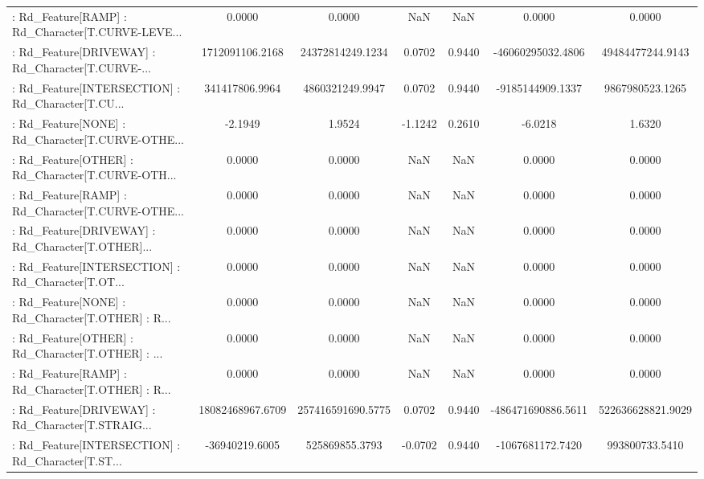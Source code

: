 \begin{longtable}{p{4cm}cccccc}
 : Rd\_Feature[RAMP] : Rd\_Character[T.CURVE-LEVE... &            0.0000 &            0.0000 &     NaN &          NaN &             0.0000 &            0.0000 \\
 : Rd\_Feature[DRIVEWAY] : Rd\_Character[T.CURVE-... &   1712091106.2168 &  24372814249.1234 &  0.0702 &       0.9440 &  -46060295032.4806 &  49484477244.9143 \\
 : Rd\_Feature[INTERSECTION] : Rd\_Character[T.CU... &    341417806.9964 &   4860321249.9947 &  0.0702 &       0.9440 &   -9185144909.1337 &   9867980523.1265 \\
 : Rd\_Feature[NONE] : Rd\_Character[T.CURVE-OTHE... &           -2.1949 &            1.9524 & -1.1242 &       0.2610 &            -6.0218 &            1.6320 \\
 : Rd\_Feature[OTHER] : Rd\_Character[T.CURVE-OTH... &            0.0000 &            0.0000 &     NaN &          NaN &             0.0000 &            0.0000 \\
 : Rd\_Feature[RAMP] : Rd\_Character[T.CURVE-OTHE... &            0.0000 &            0.0000 &     NaN &          NaN &             0.0000 &            0.0000 \\
 : Rd\_Feature[DRIVEWAY] : Rd\_Character[T.OTHER]... &            0.0000 &            0.0000 &     NaN &          NaN &             0.0000 &            0.0000 \\
 : Rd\_Feature[INTERSECTION] : Rd\_Character[T.OT... &            0.0000 &            0.0000 &     NaN &          NaN &             0.0000 &            0.0000 \\
 : Rd\_Feature[NONE] : Rd\_Character[T.OTHER] : R... &            0.0000 &            0.0000 &     NaN &          NaN &             0.0000 &            0.0000 \\
 : Rd\_Feature[OTHER] : Rd\_Character[T.OTHER] : ... &            0.0000 &            0.0000 &     NaN &          NaN &             0.0000 &            0.0000 \\
 : Rd\_Feature[RAMP] : Rd\_Character[T.OTHER] : R... &            0.0000 &            0.0000 &     NaN &          NaN &             0.0000 &            0.0000 \\
 : Rd\_Feature[DRIVEWAY] : Rd\_Character[T.STRAIG... &  18082468967.6709 & 257416591690.5775 &  0.0702 &       0.9440 & -486471690886.5611 & 522636628821.9029 \\
 : Rd\_Feature[INTERSECTION] : Rd\_Character[T.ST... &    -36940219.6005 &    525869855.3793 & -0.0702 &       0.9440 &   -1067681172.7420 &    993800733.5410 \\

\end{longtable}
